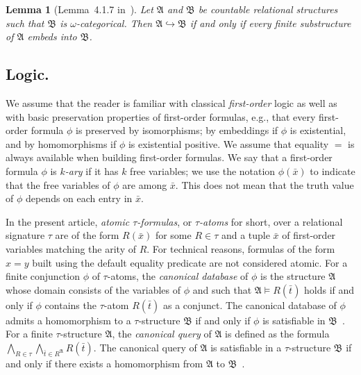 \documentclass[oneside,reqno,12pt]{amsart}
\theoremstyle{plain}
\newtheorem{lemma}[thm]{Lemma}
\theoremstyle{remark}
\newcommand{\struct}[1]{\mathfrak{#1}}
\begin{document}
{\begin{lemma}[Lemma~4.1.7 in~\cite{Bodirsky_book}] \label{lemma:compactness} Let $\struct{A}$ and $\struct{B}$ be countable relational structures such that $\struct{B}$ is $\omega$-categorical.
Then $\struct{A} \hookrightarrow \struct{B}$ if and only if every finite substructure of $\struct{A}$ embeds into $\struct{B}$.
\end{lemma}

\subsection{Logic.} \label{section:prelims_logic}
We assume that the reader is familiar with classical \emph{first-order} logic as well as with basic preservation properties of first-order formulas, e.g., that every first-order formula $\phi$ is preserved by isomorphisms; by embeddings if $\phi$ is existential, and by homomorphisms if $\phi$ is existential positive.
We assume that equality $=$ is always available when building first-order formulas.
We say that a first-order formula $\phi$ is \emph{$k$-ary} if it has $k$ free variables; we use the notation $\phi(\bar{x})$ to indicate that the free variables of $\phi$ are among $\bar{x}$.
This does not mean that the truth value of $\phi$ depends on each entry in $\bar{x}$. 

In the present article, \emph{atomic $\tau$-formulas}, or \emph{$\tau$-atoms} for short, over a relational signature $\tau$ are of the form $R(\bar{x})$ for some $R\in \tau$ and a tuple $\bar{x}$ of first-order variables matching the arity of $R$.
For technical reasons, formulas of the form $x=y$ built using the default equality predicate are not considered atomic.
For a finite conjunction $\phi$ of $\tau$-atoms, the \emph{canonical database} of $\phi$ is the structure $\struct{A}$ whose domain consists of the variables of $\phi$ and such that $\struct{A}\models R(\bar{t})$ holds if and only if $\phi$ contains the $\tau$-atom $R(\bar{t})$ as a conjunct.
The canonical database of $\phi$ admits a homomorphism to a $\tau$-structure $\struct{B}$
if and only if $\phi$ is satisfiable in $\struct{B}$~\cite{10.1145/800105.803397}.
For a finite $\tau$-structure $\struct{A}$, the \emph{canonical query} of $\struct{A}$ 
is defined as the formula $ \bigwedge\nolimits_{R\in \tau}\bigwedge\nolimits_{\bar{t}\in R^{\struct{A}}} R(\bar{t})$. 
The canonical query of $\struct{A}$ is satisfiable in a $\tau$-structure $\struct{B}$ if and only if there exists a homomorphism from $\struct{A}$ to $\struct{B}$~\cite{10.1145/800105.803397}. 

}
\end{document}
